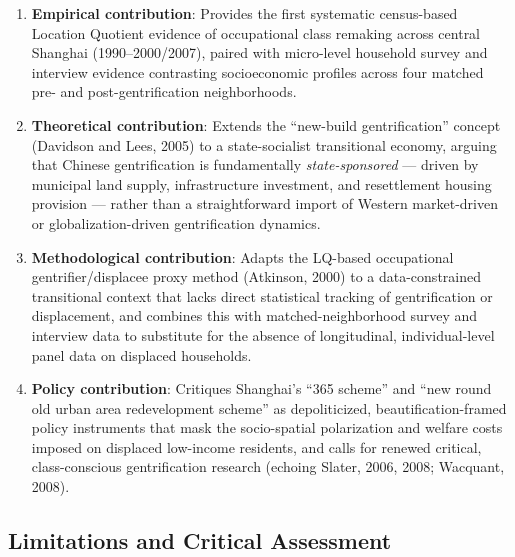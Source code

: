 \begin{enumerate}
  \item \textbf{Empirical contribution}: Provides the first systematic census-based Location Quotient evidence of occupational class remaking across central Shanghai (1990--2000/2007), paired with micro-level household survey and interview evidence contrasting socioeconomic profiles across four matched pre- and post-gentrification neighborhoods.
  \item \textbf{Theoretical contribution}: Extends the ``new-build gentrification'' concept (Davidson and Lees, 2005) to a state-socialist transitional economy, arguing that Chinese gentrification is fundamentally \emph{state-sponsored} --- driven by municipal land supply, infrastructure investment, and resettlement housing provision --- rather than a straightforward import of Western market-driven or globalization-driven gentrification dynamics.
  \item \textbf{Methodological contribution}: Adapts the LQ-based occupational gentrifier/displacee proxy method (Atkinson, 2000) to a data-constrained transitional context that lacks direct statistical tracking of gentrification or displacement, and combines this with matched-neighborhood survey and interview data to substitute for the absence of longitudinal, individual-level panel data on displaced households.
  \item \textbf{Policy contribution}: Critiques Shanghai's ``365 scheme'' and ``new round old urban area redevelopment scheme'' as depoliticized, beautification-framed policy instruments that mask the socio-spatial polarization and welfare costs imposed on displaced low-income residents, and calls for renewed critical, class-conscious gentrification research (echoing Slater, 2006, 2008; Wacquant, 2008).
\end{enumerate}

\subsection*{Limitations and Critical Assessment}


